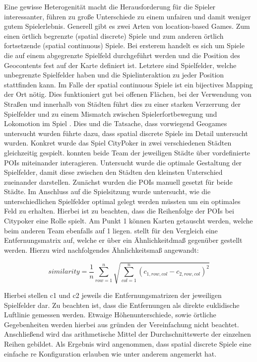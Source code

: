Eine gewisse Heterogenität macht die Herausforderung für die Spieler interessanter, führen zu große Unterschiede zu einem unfairen und damit weniger gutem Spielerlebnis.
Generell gibt es zwei Arten von location-based Games. Zum einen örtlich begrenzte (spatial discrete) Spiele und zum anderen örtlich fortsetzende (spatial
continuous) Spiele.
Bei ersterem handelt es sich um Spiele die auf einem abgegrenzte Spielfeld durchgeführt werden und die Position des Geocontents fest auf der Karte definiert ist. Letztere sind Spielfelder, welche unbegrenzte Spielfelder haben und die Spielinteraktion zu jeder Position stattfinden kann.
Im Falle der spatial continuous Spiele ist ein bijectives Mapping der Ort nötig. Dies funktioniert gut bei offenen Flächen, bei der Verwendung von Straßen und innerhalb von Städten führt dies zu einer starken Verzerrung der Spielfelder und zu einem Mismatch zwischen Spielerfortbewegung und Lokomotion im Spiel .
Dies und die Tatsache, dass vorwiegend Geogames untersucht wurden führte dazu, dass spatial discrete Spiele im Detail untersucht wurden.
Konkret wurde das Spiel CityPoker\cite{Kiefer.2005b} in zwei verschiedenen Städten gleichzeitig gespielt. konnten beide Team der jeweiligen Städte über vordefinierte POIs miteinander interagieren. Untersucht wurde die optimale Gestaltung der Spielfelder, damit diese zwischen den Städten den kleinsten Unterschied zueinander darstellen. Zunächst wurden die POIs manuell gesetzt für beide Städte. Im Anschluss auf die Spielsitzung wurde untersucht, wie die unterschiedlichen Spielfelder optimal gelegt werden müssten um ein optimales Feld zu erhalten. Hierbei ist zu beachten, dass die Reihenfolge der POIs bei Citypoker eine Rolle spielt. Am Punkt 1 können Karten getauscht werden, welche beim anderen Team ebenfalls auf 1 liegen. \cite{Kiefer.2007} stellt für den Vergleich eine Entfernungsmatrix auf, welche er über ein Ähnlichkeitdmaß gegenüber gestellt werden.
Hierzu wird nachfolgendes Ähnlichkeitsmaß angewandt:

\begin{equation}
similarity = \frac{1}{n} \sum_{row=1}^{n} \sqrt{ \sum_{col=1}^{n} (c_{1,row,col} - c_{2,row,col})^2 }
\end{equation}

Hierbei stellen c1 und c2 jeweils die Entfernungsmatrizen der jeweiligen Spielfelder dar.
Zu beachten ist, dass die Entfernungen als direkte euklidische Luftlinie gemessen werden. Etwaige Höhenunterschiede, sowie örtliche Gegebenheiten werden hierbei aus gründen der Vereinfachung nicht beachtet. Anschließend wird das arithmetische Mittel der Durchschnittswerte der einzelnen Reihen gebildet.
Als Ergebnis wird angenommen, dass spatial discrete Spiele eine einfache
re Konfiguration erlauben wie unter anderem \cite{Benford.2005} angemerkt hat.

